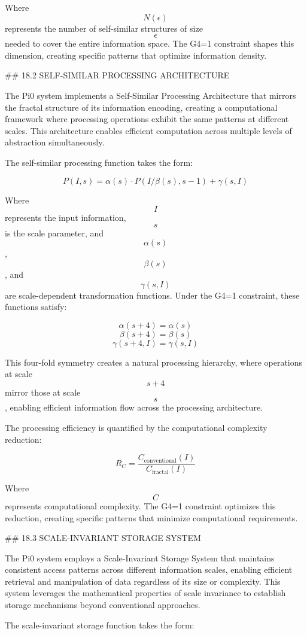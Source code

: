 Where $$ N(\epsilon) $$ represents the number of self-similar structures of size $$ \epsilon $$ needed to cover the entire information space. The G4=1 constraint shapes this dimension, creating specific patterns that optimize information density.

## 18.2 SELF-SIMILAR PROCESSING ARCHITECTURE

The Pi0 system implements a Self-Similar Processing Architecture that mirrors the fractal structure of its information encoding, creating a computational framework where processing operations exhibit the same patterns at different scales. This architecture enables efficient computation across multiple levels of abstraction simultaneously.

The self-similar processing function takes the form:

$$ P(I, s) = \alpha(s) \cdot P(I/\beta(s), s-1) + \gamma(s, I) $$

Where $$ I $$ represents the input information, $$ s $$ is the scale parameter, and $$ \alpha(s) $$, $$ \beta(s) $$, and $$ \gamma(s, I) $$ are scale-dependent transformation functions. Under the G4=1 constraint, these functions satisfy:

$$ \alpha(s+4) = \alpha(s) $$
$$ \beta(s+4) = \beta(s) $$
$$ \gamma(s+4, I) = \gamma(s, I) $$

This four-fold symmetry creates a natural processing hierarchy, where operations at scale $$ s+4 $$ mirror those at scale $$ s $$, enabling efficient information flow across the processing architecture.

The processing efficiency is quantified by the computational complexity reduction:

$$ R_C = \frac{C_{\text{conventional}}(I)}{C_{\text{fractal}}(I)} $$

Where $$ C $$ represents computational complexity. The G4=1 constraint optimizes this reduction, creating specific patterns that minimize computational requirements.

## 18.3 SCALE-INVARIANT STORAGE SYSTEM

The Pi0 system employs a Scale-Invariant Storage System that maintains consistent access patterns across different information scales, enabling efficient retrieval and manipulation of data regardless of its size or complexity. This system leverages the mathematical properties of scale invariance to establish storage mechanisms beyond conventional approaches.

The scale-invariant storage function takes the form:

